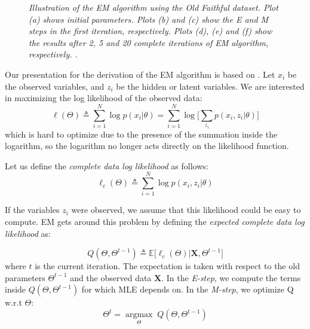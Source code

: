 \begin{figure}[ht!]
\begin{center}
{        }
    \end{center}
    \caption{\emph{Illustration of the EM algorithm using the Old Faithful dataset. Plot (a) shows initial parameters. Plots (b) and (c) show the E and M steps in the first iteration, respectively. Plots (d), (e) and (f) show the results after 2, 5 and 20 complete iterations of EM algorithm, respectively. \cite[Ch. \ 9]{Bishop2006}.}}
   \label{em-algorithm-pic}
\end{figure}

Our presentation for the derivation of the EM algorithm is based on \cite[Ch. \ 11]{Murphy2012}. Let $x_{i}$ be the observed variables, and $z_{i}$ be the hidden or latent variables. We are interested in maximizing the log likelihood of the observed data:
\begin{equation} \label{log-lik-observed-f-mm}
	\ell(\Theta) \triangleq \sum_{i=1}^{N} \log p(x_{i}|\theta) =  \sum_{i=1}^{N} \log \bigg[\sum_{z_{i}} p(x_{i}, z_{i}|\theta) \bigg]
\end{equation}
which is hard to optimize due to the presence of the summation inside the logarithm, so the logarithm no longer acts directly on the likelihood function.

Let us define the \emph{complete data log likelihood} as follows:
\begin{equation} \label{log-lik-comp-observed-f-mm}
	\ell_{c}(\Theta) \triangleq \sum_{i=1}^{N} \log p(x_{i}, z_{i}|\theta)
\end{equation}

If the variables $z_{i}$ were observed, we assume that this likelihood could be easy to compute. EM gets around this problem by defining the \emph{expected complete data log likelihood} as:

\begin{equation} \label{log-lik-expected-f-mm}
		Q(\Theta, \Theta^{t-1}) \triangleq \mathbb{E} \big[\ell_{c}(\Theta) | \mathbf{X}, \Theta^{t-1}\big]
\end{equation}
where $t$ is the current iteration. The expectation is taken with respect to the old parameters $\Theta^{t-1}$ and the observed data $\mathbf{X}$. In the \emph{E-step}, we compute the terms inside $Q(\Theta, \Theta^{t-1})$ for which MLE depends on. In the \emph{M-step}, we optimize Q w.r.t $\Theta$:
\begin{equation} \label{max-log-lik-observed-f-mm}
	\Theta^{t} = \underset{\Theta}{\operatorname{argmax}} \; Q(\Theta, \Theta^{t-1})
\end{equation}


